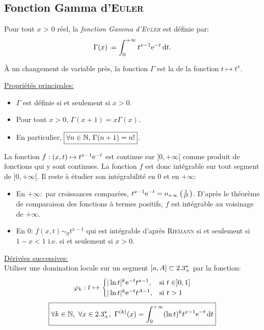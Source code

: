 \subsection{Fonction Gamma d'\textsc{Euler}}

\begin{marginfigure}[5cm]
    
    \caption{Graphe de la fonction Gamma}
\end{marginfigure}

\begin{defi}
    Pour tout $x$ > 0 réel, la \emph{fonction Gamma d'\textsc{Euler}} est définie par: 
    $$\Gamma(x) \defeq \int_{0}^{+\infty} t^{x-1} \me^{-t} \d t.$$
\end{defi}


\begin{remarque}
    À un changement de variable près, la fonction $\Gamma$ est la  de la fonction $t \mapsto t^x$. 
\end{remarque} 
\underline{Propriétés principales:}
\begin{itemize}
    \item $\Gamma$ est définie si et seulement si $x>0$.
    \item Pour tout $x > 0$, $\Gamma(x+1) = x\Gamma(x)$.
    \item En particulier, $\boxed{\forall n \in \mathbb{N}$, $\Gamma(n+1) = n!}$. 
\end{itemize}
\begin{preuve}
    La fonction $f:(x,t) \mapsto t^{x-1} \mathrm{e}^{-t}$ est continue sur $]0, + \infty[$ comme produit de fonctions qui y sont continues. La fonction $f$ est donc intégrable sur tout segment de $]0, +\infty[$. Il reste à étudier son intégrabilité en $0$ et en $+ \infty$:
    \begin{itemize}
        \item En $+\infty:$ par croissances comparées, $t^{x-1} \mathrm{e}^{-t} = o_{+\infty} \left(\frac{1}{t^2} \right)$. D'après le théorème de comparaison des fonctions à termes positifs, $f$ est intégrable au voisinage de $+\infty$.
        \item En $0$: $f(x,t) \sim_0 t^{x-1}$ qui est intégrable d'après \textsc{Riemann} si et seulement si $1-x < 1$ i.e. si et seulement si $\boxed{x > 0}$.
    \end{itemize}
\end{preuve}
\underline{Dérivées successives:} \\
Utiliser une domination locale sur un segment $[a, A] \subset 2.3_+^\star$ par la fonction:
$$\varphi_k:t \mapsto 
\begin{cases}
    |\ln t |^k \mathrm{e}^{-t} t^{a-1}, & \text{si } t \in ]0, 1] \\
    |\ln t |^k \mathrm{e}^{-t} t^{A-1}, & \text{si } t > 1
\end{cases}
$$
$$\boxed{\forall k \in \mathbb{N},\ \forall x \in 2.3_+^\star,\ \Gamma^{(k)}(x) = \int_{0}^{+\infty} (\ln t)^k t^{x-1} \mathrm{e}^{-t} \, \mathrm{d} t}$$

